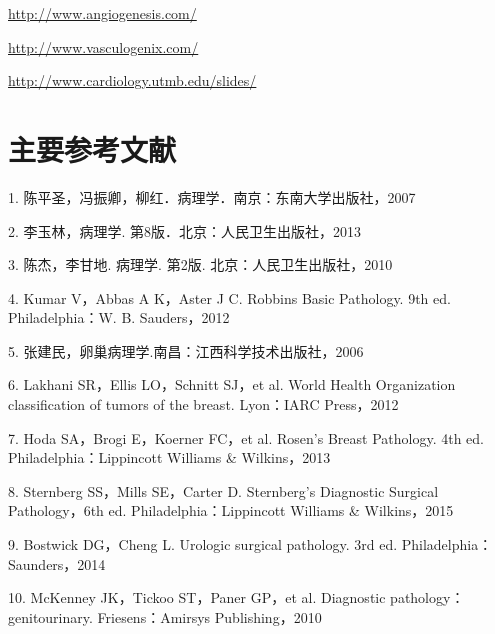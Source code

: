 \url{http://www.angiogenesis.com/}

\url{http://www.vasculogenix.com/}

\url{http://www.cardiology.utmb.edu/slides/}



\chapter{主要参考文献}

1. 陈平圣，冯振卿，柳红．病理学．南京：东南大学出版社，2007

2. 李玉林，病理学. 第8版．北京：人民卫生出版社，2013

3. 陈杰，李甘地. 病理学. 第2版. 北京：人民卫生出版社，2010

4. Kumar V，Abbas A K，Aster J C. Robbins Basic Pathology. 9th ed.
Philadelphia：W. B. Sauders，2012

5. 张建民，卵巢病理学.南昌：江西科学技术出版社，2006

6. Lakhani SR，Ellis LO，Schnitt SJ，et al. World Health Organization
classification of tumors of the breast. Lyon：IARC Press，2012

7. Hoda SA，Brogi E，Koerner FC，et al. Rosen's Breast Pathology. 4th
ed. Philadelphia：Lippincott Williams \& Wilkins，2013

8. Sternberg SS，Mills SE，Carter D. Sternberg's Diagnostic Surgical
Pathology，6th ed. Philadelphia：Lippincott Williams \& Wilkins，2015

9. Bostwick DG，Cheng L. Urologic surgical pathology. 3rd ed.
Philadelphia：Saunders，2014

10. McKenney JK，Tickoo ST，Paner GP，et al. Diagnostic
pathology：genitourinary. Friesens：Amirsys Publishing，2010

